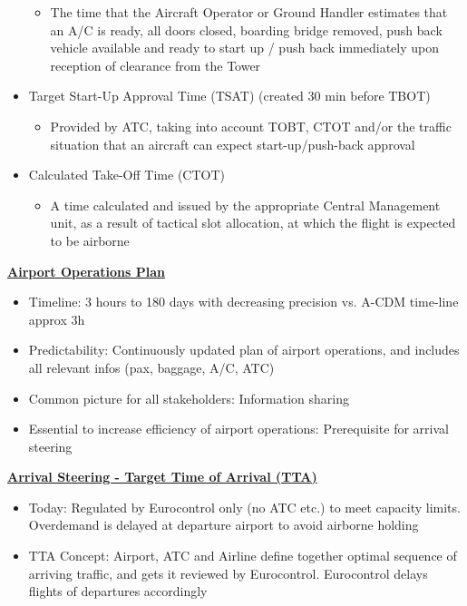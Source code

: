 \documentclass[9pt, landscape, fleqn]{scrartcl}
\begin{document}
\begin{multicols*}{3}
\begin{itemize}
    \begin{itemize}
        \item The time that the Aircraft Operator or Ground Handler estimates that an A/C is ready, all doors closed, boarding bridge removed, push back vehicle available and ready to start up / push back immediately upon reception of clearance from the Tower 
    \end{itemize}
    \item Target Start-Up Approval Time (TSAT) (created 30 min before TBOT)
    \begin{itemize}
        \item Provided by ATC, taking into account TOBT, CTOT and/or the traffic situation that an aircraft can expect start-up/push-back approval 
    \end{itemize}
    \item Calculated Take-Off Time (CTOT)
    \begin{itemize}
        \item A time calculated and issued by the appropriate Central Management unit, as a result of tactical slot allocation, at which the flight is expected to be airborne 
    \end{itemize}
\end{itemize}
\underline{\textbf{Airport Operations Plan}}
\begin{itemize}
    \item Timeline: 3 hours to 180 days with decreasing precision vs. A-CDM time-line approx 3h
    \item Predictability: Continuously updated plan of airport operations, and includes all relevant infos (pax, baggage, A/C, ATC)
    \item Common picture for all stakeholders: Information sharing 
    \item Essential to increase efficiency of airport operations: Prerequisite for arrival steering
\end{itemize}
\underline{\textbf{Arrival Steering - Target Time of Arrival (TTA)}}
\begin{itemize}
    \item Today: Regulated by Eurocontrol only (no ATC etc.) to meet capacity limits. Overdemand is delayed at departure airport to avoid airborne holding
    \item TTA Concept: Airport, ATC and Airline define together optimal sequence of arriving traffic, and gets it reviewed by Eurocontrol. Eurocontrol delays flights of departures accordingly
\end{itemize}

\end{multicols*}
\end{document}
